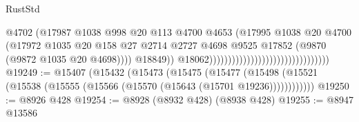 \begin{lexlean}{RustStd}
\begin{coremodule}
                                                                      @4702
                                                                      (@17987
                                                                        @1038
                                                                        @998
                                                                        @20
                                                                        @113
                                                                        @4700
                                                                        @4653
                                                                        (@17995
                                                                          @1038
                                                                          @20
                                                                          @4700
                                                                          (@17972
                                                                            @1035
                                                                            @20
                                                                            @158
                                                                            @27
                                                                            @2714
                                                                            @2727
                                                                            @4698
                                                                            @9525
                                                                            @17852
                                                                            (@9870
                                                                              (@9872
                                                                                @1035
                                                                                @20
                                                                                @4698))))
                                                                        @18849))
                                                                    @18062))))))))))))))))))))))))))))))))
@19249 := @15407
    (@15432
      (@15473
        (@15475
          (@15477 (@15498 (@15521 (@15538 (@15555 (@15566 (@15570 (@15643 (@15701 @19236))))))))))))
@19250 := @8926 @428
@19254 := @8928 (@8932 @428) (@8938 @428)
@19255 := @8947 @13586

\end{coremodule}
\end{lexlean}
